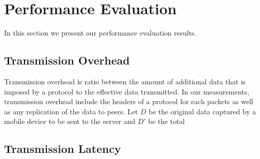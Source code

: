 \section{Performance Evaluation}\label{sec-evaluation}

In this section we present our performance evaluation results.

\subsection{Transmission Overhead}

Transmission overhead is ratio between the amount of additional data that
is imposed by a protocol to the effective data transmitted. In our
measurements, transmission overhead include the headers of a protocol for
each packets as well as any replication of the data to peers. Let $D$ be
the original data captured by a mobile device to be sent to the server and
$D'$ be the total 
 


\subsection{Transmission Latency}